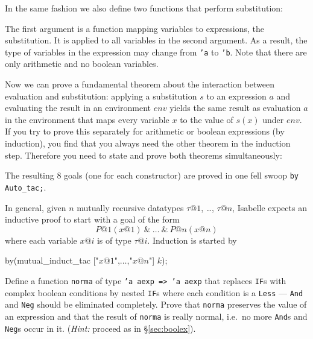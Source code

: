 In the same fashion we also define two functions that perform substitution:
\begin{ttbox}
\end{ttbox}
The first argument is a function mapping variables to expressions, the
substitution. It is applied to all variables in the second argument. As a
result, the type of variables in the expression may change from \texttt{'a}
to \texttt{'b}. Note that there are only arithmetic and no boolean variables.
\begin{ttbox}

\end{ttbox}

Now we can prove a fundamental theorem about the interaction between
evaluation and substitution: applying a substitution $s$ to an expression $a$
and evaluating the result in an environment $env$ yields the same result as
evaluation $a$ in the environment that maps every variable $x$ to the value
of $s(x)$ under $env$. If you try to prove this separately for arithmetic or
boolean expressions (by induction), you find that you always need the other
theorem in the induction step. Therefore you need to state and prove both
theorems simultaneously:
\begin{quote}\small

\end{quote}
The resulting 8 goals (one for each constructor) are proved in one fell swoop
\texttt{by Auto_tac;}.

In general, given $n$ mutually recursive datatypes $\tau@1$, \dots, $\tau@n$,
Isabelle expects an inductive proof to start with a goal of the form
\[ P@1(x@1)\ \texttt{\&}\ \dots\ \texttt{\&}\ P@n(x@n) \]
where each variable $x@i$ is of type $\tau@i$. Induction is started by
\begin{ttbox}
by(mutual_induct_tac ["\(x@1\)",\(\dots\),"\(x@n\)"] \(k\));
\end{ttbox}

\begin{exercise}
  Define a function \texttt{norma} of type \texttt{'a aexp => 'a aexp} that
  replaces \texttt{IF}s with complex boolean conditions by nested
  \texttt{IF}s where each condition is a \texttt{Less} --- \texttt{And} and
  \texttt{Neg} should be eliminated completely. Prove that \texttt{norma}
  preserves the value of an expression and that the result of \texttt{norma}
  is really normal, i.e.\ no more \texttt{And}s and \texttt{Neg}s occur in
  it.  ({\em Hint:} proceed as in \S\ref{sec:boolex}).
\end{exercise}

